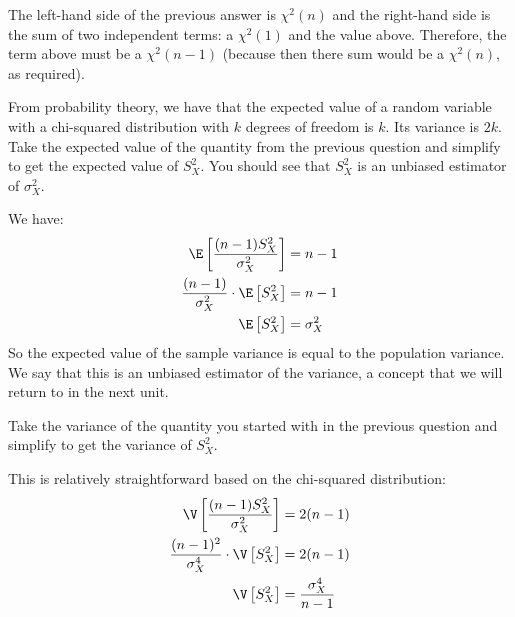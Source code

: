 
The left-hand side of the previous answer is $\chi^2(n)$ and the right-hand
side is the sum of two independent terms: a $\chi^2(1)$ and the value above. Therefore,
the term above must be a $\chi^2(n-1)$ (because then there sum would be a $\chi^2(n)$,
as required). 


From probability theory, we have that the expected value of a random variable with
a chi-squared distribution with $k$ degrees of freedom is $k$. Its variance is $2k$.
Take the expected value of the quantity from the previous question and
simplify to get the expected value of $S_X^2$. You should see that $S_X^2$ is
an unbiased estimator of $\sigma_X^2$.


We have:
\begin{align*}
\E \left[ \frac{(n-1) S_X^2}{\sigma_X^2} \right] &= n-1 \\
\frac{(n-1)}{\sigma_X^2} \cdot \E \left[ S_X^2 \right] &= n-1 \\
\E \left[ S_X^2 \right] &= \sigma_X^2
\end{align*}
So the expected value of the sample variance is equal to the population variance.
We say that this is an unbiased estimator of the variance, a concept that we will
return to in the next unit.


Take the
variance of the quantity you started with in the previous question and simplify
to get the variance of $S_X^2$.


This is relatively straightforward based on the chi-squared distribution:
\begin{align*}
\V \left[ \frac{(n-1) S_X^2}{\sigma_X^2} \right] &= 2(n-1) \\
\frac{(n-1)^2}{\sigma_X^4} \cdot \V \left[ S_X^2 \right] &= 2(n-1) \\
\V \left[ S_X^2 \right] &= \frac{\sigma_X^4}{n-1}
\end{align*}

